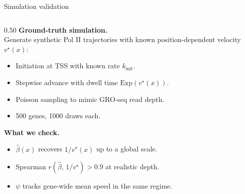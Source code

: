 \documentclass[aspectratio=169,11pt]{beamer}
\begin{document}
\begin{frame}{Simulation validation}
\begin{columns}[T,onlytextwidth]
\begin{column}{0.50\textwidth}
  \vspace{0.3em}
  {\color{KGold}\bfseries\small Ground-truth simulation.}\\[0.2em]
  {\color{KWhite}\small Generate synthetic Pol II trajectories with known
  position-dependent velocity $v^{\star}(x)$:}
  \begin{itemize}
    \setlength{\itemsep}{0.2em}
    \item Initiation at TSS with known rate $k_{\text{init}}$.
    \item Stepwise advance with dwell time $\mathrm{Exp}(v^\star(x))$.
    \item Poisson sampling to mimic GRO-seq read depth.
    \item 500 genes, 1000 draws each.
  \end{itemize}
  \medskip
  {\color{KGold}\bfseries\small What we check.}
  \begin{itemize}
    \setlength{\itemsep}{0.2em}
    \item $\widehat\beta(x)$ recovers $1/v^\star(x)$ up to a global scale.
    \item Spearman $r(\widehat\beta,\,1/v^\star) > 0.9$ at realistic depth.
    \item $\psi$ tracks gene-wide mean speed in the same regime.
  \end{itemize}
\end{column}
\end{columns}
\end{frame}
\end{document}
